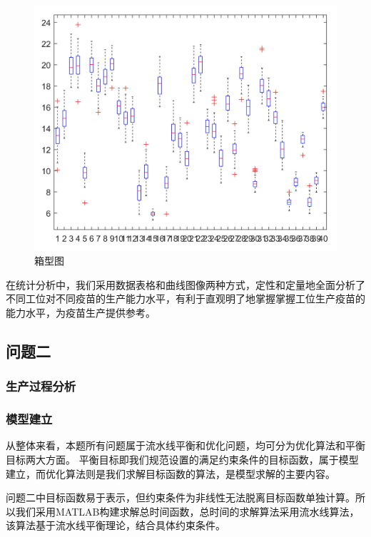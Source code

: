 \documentclass[UTF8]{ctexart}
\begin{document}
	\begin{figure}[H]
		\centering %
		\includegraphics[scale=0.5]{2_xiangxing.jpg}
		\caption{箱型图}
	\end{figure}
	在统计分析中，我们采用数据表格和曲线图像两种方式，定性和定量地全面分析了不同工位对不同疫苗的生产能力水平，有利于直观明了地掌握掌握工位生产疫苗的能力水平，为疫苗生产提供参考。
	
	\subsection{问题二}
	\subsubsection{生产过程分析}
	\subsubsection{模型建立}
	从整体来看，本题所有问题属于流水线平衡和优化问题，均可分为优化算法和平衡目标两大方面。%
	平衡目标即我们规范设置的满足约束条件的目标函数，属于模型建立，而优化算法则是我们求解目标函数的算法，是模型求解的主要内容。
		
	问题二中目标函数易于表示，但约束条件为非线性无法脱离目标函数单独计算。所以我们采用MATLAB构建求解总时间函数，总时间的求解算法采用流水线算法，该算法基于流水线平衡理论，结合具体约束条件。
	
\end{document}
